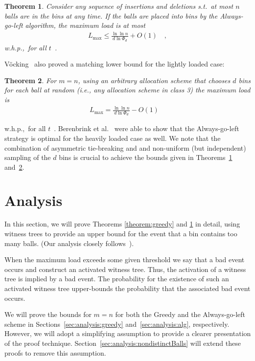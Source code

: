 \documentclass[a4paper,12pt]{article}
\newcommand\load{L_{\mathrm{max}}}
\newtheorem{theorem}{Theorem}
\begin{document}
\begin{theorem}
\label{theorem:aglm}
Consider any sequence of insertions and deletions s.t.~at most $n$ balls are in the bins at any time. If the balls are placed into bins by the Always-go-left algorithm, the maximum load is at most 
\begin{align*}
\load \leq \frac{\ln\ln n}{d  \ln \Phi_d} + O(1) \quad ,
\end{align*}
w.h.p.,~for all $t$~\cite{VOC03}.
\end{theorem}
\noindent
V\"ocking~\cite{VOC03} also proved a matching lower bound for the lightly loaded case:
\begin{theorem}
\label{theorem:aglmLower}
For $m=n$, using an arbitrary allocation scheme that chooses $d$ bins for each ball at random (i.e., any allocation scheme in class 3) the maximum load is
\begin{align*}
\load = \frac{\ln \ln n}{d \ln \Phi_d} - O(1) \quad 
\end{align*}
\end{theorem}
\noindent
w.h.p.,~for all $t$~\cite{VOC03}. Berenbrink et al.~\cite{BCSV06} were able to show that the Always-go-left strategy is optimal for the heavily loaded case as well. We note that the combination of asymmetric tie-breaking and and non-uniform (but independent) sampling of the $d$ bins is crucial to achieve the bounds given in Theorems~\ref{theorem:aglm} and~\ref{theorem:aglmLower}.

\section{Analysis}
\label{sec:analysis}
In this section, we will prove Theorems \ref{theorem:greedy} and \ref{theorem:aglm} in detail, using witness trees to provide an upper bound for the event that a bin contains too many balls. (Our analysis closely follows~\cite{VOC03}).

When the maximum load exceeds some given threshold we say that a bad event occurs and construct an activated witness tree. Thus, the activation of a witness tree is implied by a bad event. The probability for the existence of such an activated witness tree upper-bounds the probability that the associated bad event occurs.

We will prove the bounds for $m=n$ for both the Greedy and the Always-go-left scheme in Sections~\ref{sec:analysis:greedy} and~\ref{sec:analysis:alg}, respectively. However, we will adopt a simplifying assumption to provide a clearer presentation of the proof technique. Section~\ref{sec:analysis:nondistinctBalls} will extend these proofs to remove this assumption. 
\end{document}
